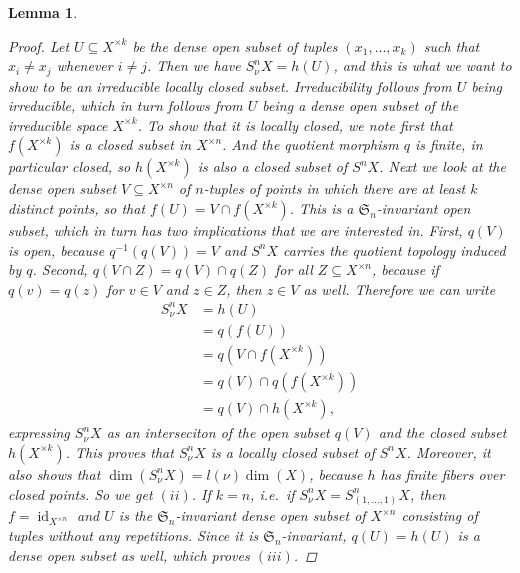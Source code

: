 \documentclass[12pt,a4paper]{amsart}
\theoremstyle{plain}
\newtheorem{lm}[thm]{Lemma}
\theoremstyle{definition}
\theoremstyle{remark}
\begin{document}
\begin{lm}
\begin{proof}
    Let $U \subseteq X^{\times k}$ be the dense open subset of tuples $(x_{1}, \ldots, x_{k})$ such that $x_{i} \neq x_{j}$ whenever $i \neq j$.
    Then we have $S^{n}_{\nu}X = h(U)$, and this is what we want to show to be an irreducible locally closed subset.
    Irreducibility follows from $U$ being irreducible, which in turn follows from $U$ being a dense open subset of the irreducible space $X^{\times k}$.
    To show that it is locally closed, we note first that $f(X^{\times k})$ is a closed subset in $X^{\times n}$.
    And the quotient morphism $q$ is finite, in particular closed, so $h(X^{\times k})$ is also a closed subset of $S^{n}X$.
    Next we look at the dense open subset $V \subseteq X^{\times n}$ of $n$-tuples of points in which there are at least $k$ distinct points, so that $f(U) = V \cap f(X^{\times k})$.
    This is a $\mathfrak{S}_{n}$-invariant open subset, which in turn has two implications that we are interested in.
    First, $q(V)$ is open, because $q^{-1}(q(V)) = V$ and $S^{n}X$ carries the quotient topology induced by $q$.
    Second, $q(V \cap Z) = q(V) \cap q(Z)$ for all $Z \subseteq X^{\times n}$, because if $q(v) = q(z)$ for $v \in V$ and $z \in Z$, then $z \in V$ as well.
    Therefore we can write
    \begin{align*}
      S_{\nu}^{n}X & = h(U) \\
      & = q(f(U)) \\
      & = q(V \cap f(X^{\times k})) \\
      & = q(V) \cap q(f(X^{\times k})) \\
      & = q(V) \cap h(X^{\times k}),
    \end{align*}
    expressing $S_{\nu}^{n}X$ as an interseciton of the open subset $q(V)$ and the closed subset $h(X^{\times k})$.
    This proves that $S_{\nu}^{n}X$ is a locally closed subset of $S^{n}X$.
    Moreover, it also shows that $\dim(S_{\nu}^{n}X) = l(\nu)\dim(X)$, because $h$ has finite fibers over closed points.
    So we get $(ii)$.
    If $k = n$, i.e.~if $S^{n}_{\nu}X = S^{n}_{(1,\ldots, 1)}X$, then $f = \operatorname{id}_{X^{\times n}}$ and $U$ is the $\mathfrak{S}_{n}$-invariant dense open subset of $X^{\times n}$ consisting of tuples without any repetitions.
    Since it is $\mathfrak{S}_{n}$-invariant, $q(U) = h(U)$ is a dense open subset as well, which proves $(iii)$.
    

\end{proof}
\end{lm}
\end{document}
